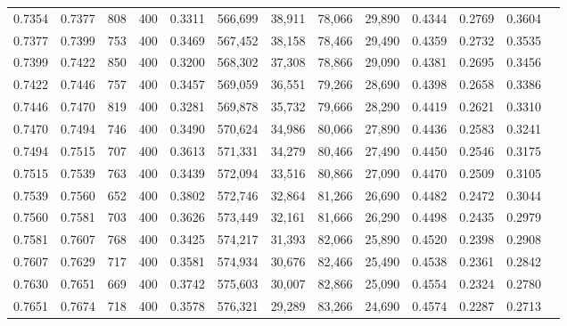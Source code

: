 \begin{tabular}{rrrrrrrrrrrrr}
0.7354 & 0.7377 &    808 & 400 &                                     0.3311 & 566,699 &  38,911 &  78,066 &  29,890 & 0.4344 & 0.2769 & 0.3604 \\
0.7377 & 0.7399 &    753 & 400 &                                     0.3469 & 567,452 &  38,158 &  78,466 &  29,490 & 0.4359 & 0.2732 & 0.3535 \\
0.7399 & 0.7422 &    850 & 400 &                                     0.3200 & 568,302 &  37,308 &  78,866 &  29,090 & 0.4381 & 0.2695 & 0.3456 \\
0.7422 & 0.7446 &    757 & 400 &                                     0.3457 & 569,059 &  36,551 &  79,266 &  28,690 & 0.4398 & 0.2658 & 0.3386 \\
0.7446 & 0.7470 &    819 & 400 &                                     0.3281 & 569,878 &  35,732 &  79,666 &  28,290 & 0.4419 & 0.2621 & 0.3310 \\
0.7470 & 0.7494 &    746 & 400 &                                     0.3490 & 570,624 &  34,986 &  80,066 &  27,890 & 0.4436 & 0.2583 & 0.3241 \\
0.7494 & 0.7515 &    707 & 400 &                                     0.3613 & 571,331 &  34,279 &  80,466 &  27,490 & 0.4450 & 0.2546 & 0.3175 \\
0.7515 & 0.7539 &    763 & 400 &                                     0.3439 & 572,094 &  33,516 &  80,866 &  27,090 & 0.4470 & 0.2509 & 0.3105 \\
0.7539 & 0.7560 &    652 & 400 &                                     0.3802 & 572,746 &  32,864 &  81,266 &  26,690 & 0.4482 & 0.2472 & 0.3044 \\
0.7560 & 0.7581 &    703 & 400 &                                     0.3626 & 573,449 &  32,161 &  81,666 &  26,290 & 0.4498 & 0.2435 & 0.2979 \\
0.7581 & 0.7607 &    768 & 400 &                                     0.3425 & 574,217 &  31,393 &  82,066 &  25,890 & 0.4520 & 0.2398 & 0.2908 \\
0.7607 & 0.7629 &    717 & 400 &                                     0.3581 & 574,934 &  30,676 &  82,466 &  25,490 & 0.4538 & 0.2361 & 0.2842 \\
0.7630 & 0.7651 &    669 & 400 &                                     0.3742 & 575,603 &  30,007 &  82,866 &  25,090 & 0.4554 & 0.2324 & 0.2780 \\
0.7651 & 0.7674 &    718 & 400 &                                     0.3578 & 576,321 &  29,289 &  83,266 &  24,690 & 0.4574 & 0.2287 & 0.2713 \\

\end{tabular}
